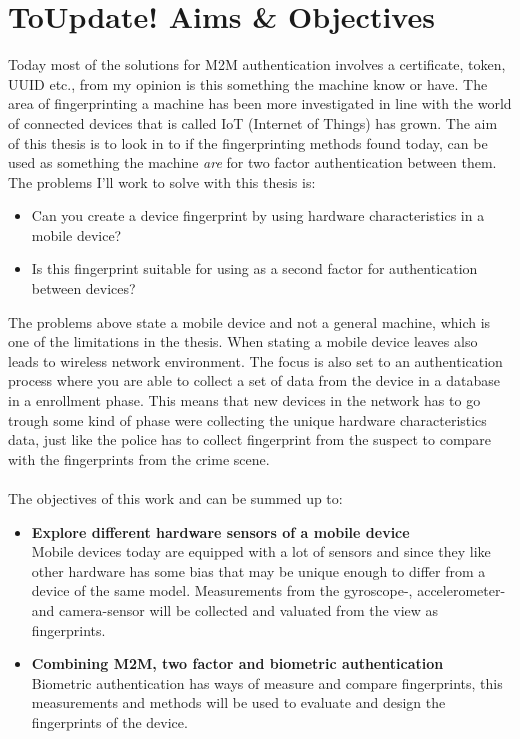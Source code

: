 \section{\textbf{ToUpdate! }Aims \& Objectives}\label{sec:aim}
Today most of the solutions for M2M authentication involves a certificate, token, UUID etc., from my opinion is this something the machine know or have. The area of fingerprinting a machine has been more investigated in line with the world of connected devices that is called IoT (Internet of Things) has grown. The aim of this thesis is to look in to if the fingerprinting methods found today, can be used as something the machine \textit{are} for two factor authentication between them. The problems I'll work to solve with this thesis is:
\begin{itemize}
	\item[] Can you create a device fingerprint by using hardware characteristics in a mobile device?
	\item[] Is this fingerprint suitable for using as a second factor for authentication between devices?
\end{itemize}
The problems above state a mobile device and not a general machine, which is one of the limitations in the thesis. When stating a mobile device leaves also leads to wireless network environment. The focus is also set to an authentication process where you are able to collect a set of data from the device in a database in a enrollment phase. This means that new devices in the network has to go trough some kind of phase were collecting the unique hardware characteristics data, just like the police has to collect fingerprint from the suspect to compare with the fingerprints from the crime scene. \\
\\
The objectives of this work and can be summed up to:
\begin{itemize}
	\item[] \textbf{Explore different hardware sensors of a mobile device} \\
	Mobile devices today are equipped with a lot of sensors and since they like other hardware has some bias that may be unique enough to differ from a device of the same model. Measurements from the gyroscope-, accelerometer- and camera-sensor will be collected and valuated from the view as fingerprints.
	\item[] \textbf{Combining M2M, two factor and biometric authentication} \\
	Biometric authentication has ways of measure and compare fingerprints, this measurements and methods will be used to evaluate and design the fingerprints of the device.
\end{itemize}

